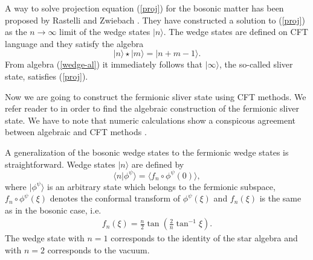 \documentclass[a4paper,12pt]{article}
\begin{document}
A way to solve projection equation (\ref{proj}) for
the bosonic matter has been proposed by Rastelli and Zwiebach
\cite{zwiebach}. They have constructed a solution to (\ref{proj})
as the $n\rightarrow\infty$ limit of the wedge states $|n\rangle$.
The wedge states are defined on CFT language and they satisfy the
algebra
\begin{equation}
|n\rangle\star |m\rangle=|n+m-1\rangle. \label{wedge-al}
\end{equation}
From algebra (\ref{wedge-al}) it immediately follows that $|\infty\rangle$,
the so-called sliver state, satisfies (\ref{proj}).

Now we are going to construct the fermionic sliver state using CFT methods.
We refer reader to \cite{ia_nsms} in order to find the algebraic construction
of the fermionic sliver state. We have to note that numeric calculations show
a conspicous agreement between algebraic and CFT methods \cite{ia_nsms}.


A generalization of the bosonic wedge states
\cite{zwiebach,RSZF} to the fermionic wedge states is
straightforward.
Wedge states $|n\rangle$ are defined by
\begin{equation}
\langle n|\phi^{\psi}\rangle=\langle f_{n}\circ\phi^{\psi}(0)\rangle,
\end{equation}
where $|\phi^{\psi}\rangle$ is an arbitrary state which belongs to
the fermionic subspace, $f_{n}\circ\phi^{\psi}(\xi)$ denotes the
conformal transform of $\phi^{\psi}(\xi)$ and $f_{n}(\xi)$ is
the same as in the bosonic case, i.e.
\begin{gather}
f_{n}(\xi)=\frac{n}{2}\tan\left(\frac{2}{n}\tan^{-1}\xi\right).\label{wedge-map}
\end{gather}
The wedge state with $n=1$ corresponds to the identity of the star
algebra and with $n=2$ corresponds to the vacuum.
\end{document}
